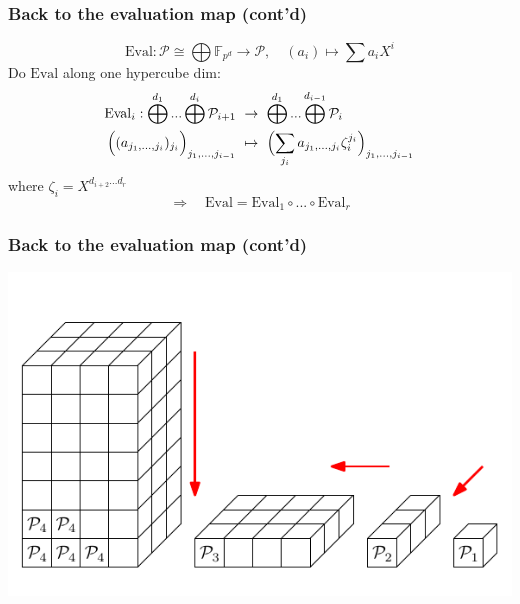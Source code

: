 \documentclass{beamer}
\newcommand{\F}{\mathbb{F}}
\begin{document}
\begin{frame}
    \frametitle{Back to the evaluation map (cont'd)}

    \begin{equation*}
        \mathrm{Eval}: \mathcal{P} \cong \bigoplus \F_{p^d} \to \mathcal{P}, \quad (a_i) \mapsto \sum a_i X^i
    \end{equation*}
    Do $\mathrm{Eval}$ along one hypercube dim:
    \begin{align*}
        \mathrm{Eval}_i: \bigoplus^{d_1} ... \bigoplus^{d_i} \mathcal{P}_{i + 1} \ &\to \ \bigoplus^{d_1} ... \bigoplus^{d_{i - 1}} \mathcal{P}_i \\
        \Bigl( (a_{j_1, ..., j_i})_{j_i} \Bigr)_{j_1, ..., j_{i - 1}} \ &\mapsto \ \Bigl( \sum_{j_i} a_{j_1, ..., j_i} \zeta_i^{j_i} \Bigr)_{j_1, ..., j_{i - 1}}
    \end{align*}
    where $\zeta_i = X^{d_{i + 2} ... d_r}$
    \begin{equation*}
        \Rightarrow \quad \mathrm{Eval} = \mathrm{Eval}_1 \circ ... \circ \mathrm{Eval}_r
    \end{equation*}
\end{frame}

\begin{frame}
    \frametitle{Back to the evaluation map (cont'd)}

    \begin{center}
        \includegraphics{reduce.pdf}
    \end{center}
\end{frame}
\end{document}
